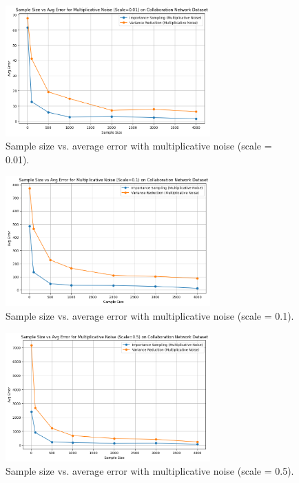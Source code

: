 \documentclass[11pt]{article}
\begin{document}
\begin{figure}[H]
    \centering
    \includegraphics[width=0.7\textwidth]{plots/simulated/percent_error_vs_sample_size_comparison_multiplicative_0.01.png}
    \caption{Sample size vs. average error with multiplicative noise (scale = 0.01).}
    \label{fig:multiplicative_noise_001}
\end{figure}

\begin{figure}[H]
    \centering
    \includegraphics[width=0.7\textwidth]{plots/simulated/percent_error_vs_sample_size_comparison_multiplicative_0.1.png}
    \caption{Sample size vs. average error with multiplicative noise (scale = 0.1).}
    \label{fig:multiplicative_noise_01}
\end{figure}

\begin{figure}[H]
    \centering
    \includegraphics[width=0.7\textwidth]{plots/simulated/percent_error_vs_sample_size_comparison_multiplicative_0.5.png}
    \caption{Sample size vs. average error with multiplicative noise (scale = 0.5).}
    \label{fig:multiplicative_noise_05}
\end{figure}
\end{document}
